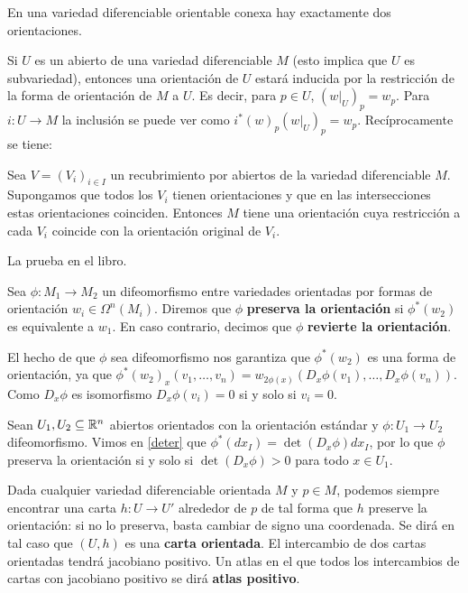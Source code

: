 \documentclass[CV.tex]{subfiles}
\begin{document}
\begin{lemma}
En una variedad diferenciable orientable conexa hay exactamente dos orientaciones.
\end{lemma}

Si $U$ es un abierto de una variedad diferenciable $M$ (esto implica que $U$ es subvariedad), entonces una orientación de $U$ estará inducida por la restricción de la forma de orientación de $M$ a $U$. Es decir, para $p\in U$, $(w|_{U})_p=w_p$. Para $i:U\to M$ la inclusión se puede ver como $i^*(w)_p(w|_{U})_p=w_p$. Recíprocamente se tiene:

\begin{lemma}\label{vi}
Sea $V=(V_i)_{i\in I}$ un recubrimiento por abiertos de la variedad diferenciable $M$. Supongamos que todos los $V_i$ tienen orientaciones y que en las intersecciones estas orientaciones coinciden. Entonces $M$ tiene una orientación cuya restricción a cada $V_i$ coincide con la orientación original de $V_i$. 
\end{lemma}
La prueba en el libro.

\begin{defi}
Sea $\phi:M_1\to M_2$ un difeomorfismo entre variedades orientadas por formas de orientación $w_i\in\Omega^n(M_i)$. Diremos que $\phi$ \textbf{preserva la orientación} si $\phi^*(w_2)$ es equivalente a $w_1$. En caso contrario, decimos que $\phi$  \textbf{revierte la orientación}.
\end{defi}

\begin{nota}
El hecho de que $\phi$ sea difeomorfismo nos garantiza que $\phi^*(w_2)$ es una forma de orientación, ya que $\phi^*(w_2)_x(v_1,\dots, v_n)=w_{2\phi(x)}(D_x\phi(v_1),\dots, D_x\phi(v_n))$. Como $D_x\phi$ es isomorfismo $D_x\phi(v_i)=0$ si y solo si $v_i=0$. 
\end{nota}

\begin{ej}
Sean $U_1,U_2\subseteq\mathbb{R}^n$ abiertos orientados con la orientación estándar y $\phi:U_1\to U_2$ difeomorfismo. Vimos en \ref{deter} que $\phi^*(dx_I)=\det(D_x\phi)dx_I$, por lo que $\phi$ preserva la orientación si y solo si $\det(D_x\phi)>0$ para todo $x\in U_1$. 
\end{ej}

Dada cualquier variedad diferenciable orientada $M$ y $p\in M$, podemos siempre encontrar una carta $h:U\to U'$ alrededor de $p$ de tal forma que $h$ preserve la orientación: si no lo preserva, basta cambiar de signo una coordenada. Se dirá en tal caso que $(U,h)$ es una \textbf{carta orientada}. El intercambio de dos cartas orientadas tendrá jacobiano positivo. Un atlas en el que todos los intercambios de cartas con jacobiano positivo se dirá \textbf{atlas positivo}.
\end{document}
